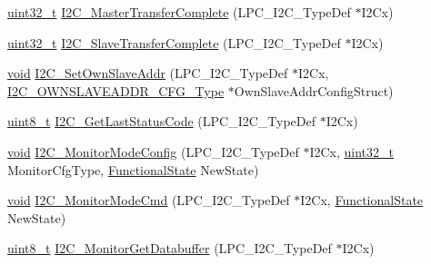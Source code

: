 \begin{DoxyCompactItemize}
\item 
\hyperlink{_p_e___types_8h_a33594304e786b158f3fb30289278f5af}{uint32\+\_\+t} \hyperlink{group___i2_c___public___functions_gaaad67181341bcd015c958f7d21420d01}{I2\+C\+\_\+\+Master\+Transfer\+Complete} (L\+P\+C\+\_\+\+I2\+C\+\_\+\+Type\+Def $\ast$I2\+Cx)
\item 
\hyperlink{_p_e___types_8h_a33594304e786b158f3fb30289278f5af}{uint32\+\_\+t} \hyperlink{group___i2_c___public___functions_ga6380268c476af8b17b7ef13f05e404d4}{I2\+C\+\_\+\+Slave\+Transfer\+Complete} (L\+P\+C\+\_\+\+I2\+C\+\_\+\+Type\+Def $\ast$I2\+Cx)
\item 
\hyperlink{usb__devapi_8h_afabf60e7f57651d6d595a02c75f07cd0}{void} \hyperlink{group___i2_c___public___functions_ga04a15375bbb68c96a97279b192ee7a5a}{I2\+C\+\_\+\+Set\+Own\+Slave\+Addr} (L\+P\+C\+\_\+\+I2\+C\+\_\+\+Type\+Def $\ast$I2\+Cx, \hyperlink{struct_i2_c___o_w_n_s_l_a_v_e_a_d_d_r___c_f_g___type}{I2\+C\+\_\+\+O\+W\+N\+S\+L\+A\+V\+E\+A\+D\+D\+R\+\_\+\+C\+F\+G\+\_\+\+Type} $\ast$Own\+Slave\+Addr\+Config\+Struct)
\item 
\hyperlink{_p_e___types_8h_aba7bc1797add20fe3efdf37ced1182c5}{uint8\+\_\+t} \hyperlink{group___i2_c___public___functions_ga268c8c03cf0f006b58d0e9ad8c00e141}{I2\+C\+\_\+\+Get\+Last\+Status\+Code} (L\+P\+C\+\_\+\+I2\+C\+\_\+\+Type\+Def $\ast$I2\+Cx)
\item 
\hyperlink{usb__devapi_8h_afabf60e7f57651d6d595a02c75f07cd0}{void} \hyperlink{group___i2_c___public___functions_gaef7e2d007e73a69844eafebfbc3e6862}{I2\+C\+\_\+\+Monitor\+Mode\+Config} (L\+P\+C\+\_\+\+I2\+C\+\_\+\+Type\+Def $\ast$I2\+Cx, \hyperlink{_p_e___types_8h_a33594304e786b158f3fb30289278f5af}{uint32\+\_\+t} Monitor\+Cfg\+Type, \hyperlink{agilefox_2library_2inc_2stm32f10x__type_8h_ac9a7e9a35d2513ec15c3b537aaa4fba1}{Functional\+State} New\+State)
\item 
\hyperlink{usb__devapi_8h_afabf60e7f57651d6d595a02c75f07cd0}{void} \hyperlink{group___i2_c___public___functions_ga236d51a39fe46151b144b56f3d5d465a}{I2\+C\+\_\+\+Monitor\+Mode\+Cmd} (L\+P\+C\+\_\+\+I2\+C\+\_\+\+Type\+Def $\ast$I2\+Cx, \hyperlink{agilefox_2library_2inc_2stm32f10x__type_8h_ac9a7e9a35d2513ec15c3b537aaa4fba1}{Functional\+State} New\+State)
\item 
\hyperlink{_p_e___types_8h_aba7bc1797add20fe3efdf37ced1182c5}{uint8\+\_\+t} \hyperlink{group___i2_c___public___functions_gaeef5efb68afc2a65ffa08572d46fd472}{I2\+C\+\_\+\+Monitor\+Get\+Databuffer} (L\+P\+C\+\_\+\+I2\+C\+\_\+\+Type\+Def $\ast$I2\+Cx)
\item 

\end{DoxyCompactItemize}
